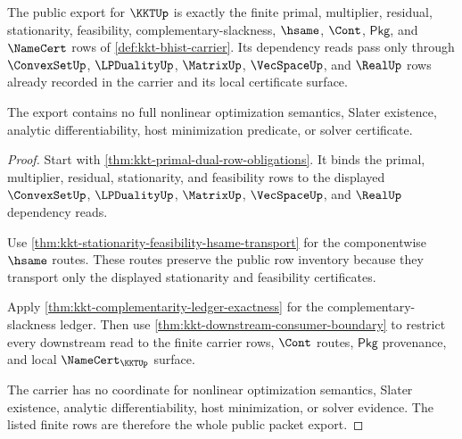 \begin{theorem}
\label{thm:kkt-public-finite-packet-export}
The public export for $\KKTUp$ is exactly the finite primal, multiplier,
residual, stationarity, feasibility, complementary-slackness, $\hsame$,
$\Cont$, $\mathsf{Pkg}$, and $\NameCert$ rows of
\autoref{def:kkt-bhist-carrier}. Its dependency reads pass only through
$\ConvexSetUp$, $\LPDualityUp$, $\MatrixUp$, $\VecSpaceUp$, and $\RealUp$ rows
already recorded in the carrier and its local certificate surface.

The export contains no full nonlinear optimization semantics, Slater
existence, analytic differentiability, host minimization predicate, or solver
certificate.
\end{theorem}
\begin{proof}
Start with \autoref{thm:kkt-primal-dual-row-obligations}. It binds the primal,
multiplier, residual, stationarity, and feasibility rows to the displayed
$\ConvexSetUp$, $\LPDualityUp$, $\MatrixUp$, $\VecSpaceUp$, and $\RealUp$
dependency reads.

Use \autoref{thm:kkt-stationarity-feasibility-hsame-transport} for the
componentwise $\hsame$ routes. These routes preserve the public row inventory
because they transport only the displayed stationarity and feasibility
certificates.

Apply \autoref{thm:kkt-complementarity-ledger-exactness} for the
complementary-slackness ledger. Then use
\autoref{thm:kkt-downstream-consumer-boundary} to restrict every downstream
read to the finite carrier rows, $\Cont$ routes, $\mathsf{Pkg}$ provenance, and
local $\NameCert_{\KKTUp}$ surface.

The carrier has no coordinate for nonlinear optimization semantics, Slater
existence, analytic differentiability, host minimization, or solver evidence.
The listed finite rows are therefore the whole public packet export.
\end{proof}

